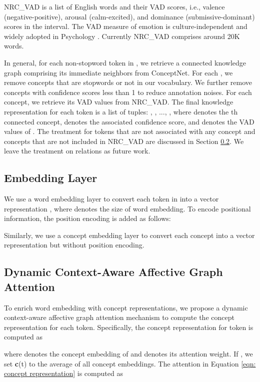 \documentclass[11pt,a4paper]{article}
\begin{document}
NRC\_VAD is a list of English words and their VAD scores, i.e., valence (negative-positive), arousal (calm-excited), and dominance (submissive-dominant) scores in the  interval. The VAD measure of emotion is culture-independent and widely adopted in Psychology \cite{mehrabian1996pleasure}. Currently NRC\_VAD comprises around 20K words.

In general, for each non-stopword token  in , we retrieve a connected knowledge graph  comprising its immediate neighbors from ConceptNet. For each , we remove concepts that are stopwords or not in our vocabulary. We further remove concepts with confidence scores less than 1 to reduce annotation noises. For each concept, we retrieve its VAD values from NRC\_VAD. The final knowledge representation for each token  is a list of tuples: , , ..., , where  denotes the th connected concept,  denotes the associated confidence score, and  denotes the VAD values of . The treatment for tokens that are not associated with any concept and concepts that are not included in NRC\_VAD are discussed in Section \ref{sec: dynamic context-aware affective graph attention}. We leave the treatment on relations as future work.

\subsection{Embedding Layer}
\label{sec: embedding}
 We use a word embedding layer to convert each token  in  into a vector representation , where  denotes the size of word embedding. To encode positional information, the position encoding \cite{vaswani2017attention} is added as follows:


Similarly, we use a concept embedding layer to convert each concept  into a vector representation  but without position encoding.

\subsection{Dynamic Context-Aware Affective Graph Attention}
\label{sec: dynamic context-aware affective graph attention}
To enrich word embedding with concept representations, we propose a dynamic context-aware affective graph attention mechanism to compute the concept representation for each token. Specifically, the concept representation  for token  is computed as

where  denotes the concept embedding of  and  denotes its attention weight. If , we set \textbf{c}(t) to the average of all concept embeddings. The attention  in Equation \ref{eqn: concept representation} is computed as
\end{document}
